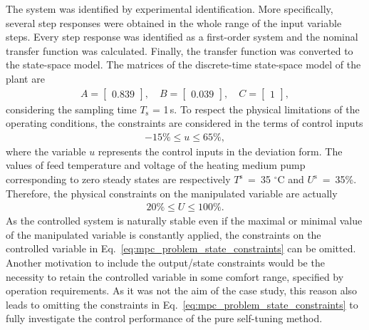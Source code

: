 \documentclass[preprint,12pt]{elsarticle}
\begin{document}
The system was identified by experimental identification. More specifically, several step responses were obtained in the whole range of the input variable steps. Every step response was identified as a first-order system and the nominal transfer function was calculated. Finally, the transfer function was converted to the state-space model. The matrices of the discrete-time state-space model of the plant are
\begin{subequations}
	\label{eq:model_A_B} 
	\begin{eqnarray}
		A = \begin{bmatrix}
			0.839
		\end{bmatrix}, \quad
		B = \begin{bmatrix}
			0.039
		\end{bmatrix}, \quad
		C = \begin{bmatrix}
			1
		\end{bmatrix}, 
	\end{eqnarray}
\end{subequations}
considering the sampling time $T_\mathrm{s}$ = 1\,s. 
To respect the physical limitations of the operating conditions, the constraints are considered in the terms of control inputs
\begin{eqnarray}
	\label{eq:u_const}
	-15\% \le u \le 65\%,
\end{eqnarray}
where the variable $u$ represents the control inputs in the deviation form. The values of feed temperature and voltage of the heating medium pump corresponding to zero steady states are respectively $T^\mathrm{s}$~=~35 $^{\circ}\mathrm{C}$ and $U^\mathrm{s}$~=~35\%. Therefore, the physical constraints on the manipulated variable are actually
\begin{eqnarray}
	\label{eq:U_const}
	20\% \le U \le 100\%.
\end{eqnarray}	
As the controlled system is naturally stable even if the maximal or minimal value of the manipulated variable is constantly applied, the constraints on the controlled variable in Eq.~\eqref{eq:mpc_problem_state_constraints} can be omitted. Another motivation to include the output/state constraints would be the necessity to retain the controlled variable in some comfort range, specified by operation requirements. As it was not the aim of the case study, this reason also leads to omitting the constraints in Eq.~\eqref{eq:mpc_problem_state_constraints} to fully investigate the control performance of the pure self-tuning method.		 
\end{document}
